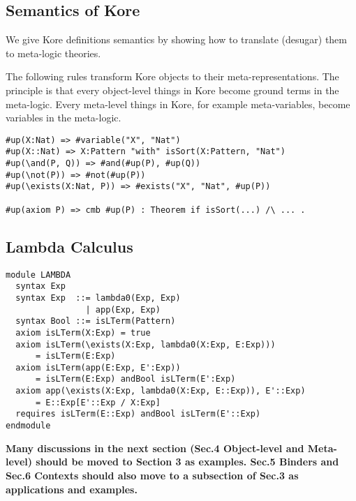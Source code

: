 \documentclass[UTF8]{article}
\newcommand{\comment}[1]
    {\par {\bfseries \color{blue} #1 \par}} %
\theoremstyle{plain}
\theoremstyle{definition}
\theoremstyle{remark}
\begin{document}
\subsection{Semantics of Kore}

We give Kore definitions semantics by showing how to translate (desugar) them to meta-logic theories. 


The following rules transform Kore objects to their meta-representations. The principle is that every object-level things in Kore become ground terms in the meta-logic. Every meta-level things in Kore, for example meta-variables, become variables in the meta-logic. 

\begin{Verbatim}
#up(X:Nat) => #variable("X", "Nat")
#up(X::Nat) => X:Pattern "with" isSort(X:Pattern, "Nat")
#up(\and(P, Q)) => #and(#up(P), #up(Q))
#up(\not(P)) => #not(#up(P))
#up(\exists(X:Nat, P)) => #exists("X", "Nat", #up(P))

#up(axiom P) => cmb #up(P) : Theorem if isSort(...) /\ ... .

\end{Verbatim} 

\subsection{Lambda Calculus}

\begin{Verbatim}
module LAMBDA
  syntax Exp
  syntax Exp  ::= lambda0(Exp, Exp)
                | app(Exp, Exp)
  syntax Bool ::= isLTerm(Pattern)
  axiom isLTerm(X:Exp) = true
  axiom isLTerm(\exists(X:Exp, lambda0(X:Exp, E:Exp)))
      = isLTerm(E:Exp)
  axiom isLTerm(app(E:Exp, E':Exp))
      = isLTerm(E:Exp) andBool isLTerm(E':Exp)
  axiom app(\exists(X:Exp, lambda0(X:Exp, E::Exp)), E'::Exp)
      = E::Exp[E'::Exp / X:Exp]
  requires isLTerm(E::Exp) andBool isLTerm(E'::Exp)
endmodule
\end{Verbatim}

\comment{Many discussions in the next section (Sec.4 Object-level and Meta-level) should be moved to Section 3 as examples. Sec.5 Binders and Sec.6 Contexts should also move to a subsection of Sec.3 as applications and examples. }
\end{document}
